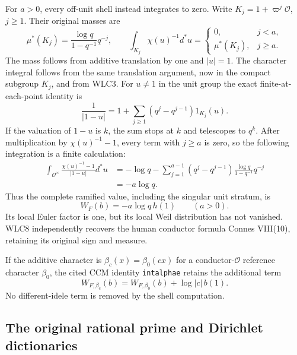 For $a>0$, every off-unit shell instead integrates to zero.
Write $K_j=1+\varpi^j\mathcal O$, $j\ge1$. Their original masses are
\begin{equation}\tag{WLC6}
 \mu^*(K_j)=\frac{\log q}{1-q^{-1}}q^{-j},\qquad
 \int_{K_j}\chi(u)^{-1}d^*u=
 \begin{cases}0,&j<a,\\\mu^*(K_j),&j\ge a.\end{cases}
\end{equation}
The mass follows from additive translation by one and $|u|=1$.
The character integral follows from the same translation argument,
now in the compact subgroup $K_j$, and from WLC3.
For $u\ne1$ in the unit group the exact finite-at-each-point identity is
\begin{equation}\tag{WLC7}
 \frac1{|1-u|}=1+
       \sum_{j\ge1}(q^j-q^{j-1})1_{K_j}(u).
\end{equation}
If the valuation of $1-u$ is $k$, the sum stops at $k$ and
telescopes to $q^k$. After multiplication by
$\chi(u)^{-1}-1$, every term with $j\ge a$ is zero, so
the following integration is a finite calculation:
\begin{equation}\tag{WLC8}
\begin{split}
 \int_{\mathcal O^\times}\frac{\chi(u)^{-1}-1}{|1-u|}d^*u
 &=-\log q-
  \sum_{j=1}^{a-1}(q^j-q^{j-1})
                    \frac{\log q}{1-q^{-1}}q^{-j}\\
 &=-a\log q.
\end{split}
\end{equation}
Thus the complete ramified value, including the singular unit stratum, is
\begin{equation}\tag{WLC9}
 W_F(b)=-a\log q\,h(1)\qquad(a>0).
\end{equation}
Its local Euler factor is one, but its local Weil distribution
has not vanished. WLC8 independently recovers the human conductor
formula Connes VIII(10), retaining its original sign and measure.

If the additive character is $\beta_c(x)=\beta_0(cx)$ for a
conductor-$\mathcal O$ reference character $\beta_0$, the cited
CCM identity \texttt{intalphae} retains the additional term
\begin{equation}\tag{WLC10}
 W_{F,\beta_c}(b)=W_{F,\beta_0}(b)+\log|c|\,b(1).
\end{equation}
No different-idele term is removed by the shell computation.

\subsection{The original rational prime and Dirichlet dictionaries}

